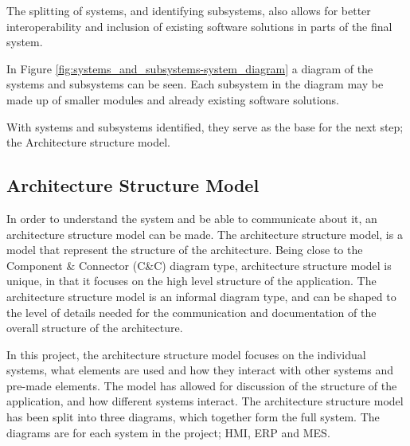 The splitting of systems, and identifying subsystems, also allows for better interoperability and inclusion of existing software solutions in parts of the final system.


In Figure \ref{fig:systems_and_subsystems-system_diagram} a diagram of the systems and subsystems can be seen.
Each subsystem in the diagram may be made up of smaller modules and already existing software solutions.


With systems and subsystems identified, they serve as the base for the next step; the Architecture structure model.

\subsection{Architecture Structure Model} %
\label{sec:architecture-structure-model}

In order to understand the system and be able to communicate about it, an architecture structure model can be made.
The architecture structure model, is a model that represent the structure of the architecture. Being close to the Component \& Connector (C\&C) diagram type, architecture structure model is unique, in that it focuses on the high level structure of the application. The architecture structure model is an informal diagram type, and can be shaped to the level of details needed for the communication and documentation of the overall structure of the architecture.

In this project, the architecture structure model focuses on the individual systems, what elements are used and how they interact with other systems and pre-made elements. The model has allowed for discussion of the structure of the application, and how different systems interact. The architecture structure model has been split into three diagrams, which together form the full system. The diagrams are for each system in the project; HMI, ERP and MES.

